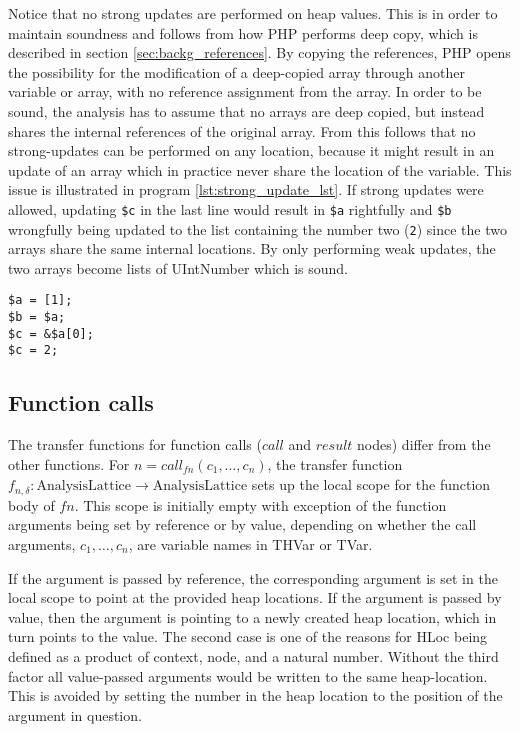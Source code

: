 Notice that no strong updates are performed on heap values. This is in order to maintain soundness and follows from how PHP performs deep copy, which is described in section \ref{sec:backg_references}. By copying the references, PHP opens the possibility for the modification of a deep-copied array through another variable or array, with no reference assignment from the array.  In order to be sound, the analysis has to assume that no arrays are deep copied, but instead shares the internal references of the original array. From this follows that no strong-updates can be performed on any location, because it might result in an update of an array which in practice never share the location of the variable. This issue is illustrated in program \ref{lst:strong_update_lst}. If strong updates were allowed, updating \texttt{\$c} in the last line would result in \texttt{\$a} rightfully and \texttt{\$b} wrongfully being updated to the list containing the number two (\texttt{2}) since the two arrays share the same internal locations. By only performing weak updates, the two arrays become lists of UIntNumber which is sound.
\begin{program}
\centering
\begin{lstlisting}
$a = [1];
$b = $a;
$c = &$a[0];
$c = 2;
\end{lstlisting}
\caption{  }
\label{lst:strong_update_lst}
\end{program}


\subsection{Function calls}
The transfer functions for function calls ($\mathit{call}$ and $\mathit{result}$ nodes) differ from the other functions. For $n = \mathit{call}_{\mathit{fn}}(c_1,\dots,c_n)$, the transfer function $f_{n,\delta} : \text{AnalysisLattice} \rightarrow \text{AnalysisLattice}$ sets up the local scope for the function body of $\mathit{fn}$. This scope is initially empty with exception of the function arguments being set by reference or by value, depending on whether the call arguments, $c_1, \dots, c_n$, are variable names in THVar or TVar. 

If the argument is passed by reference, the corresponding argument is set in the local scope to point at the provided heap locations. If the argument is passed by value, then the argument is pointing to a newly created heap location, which in turn points to the value. The second case is one of the reasons for HLoc being defined as a product of context, node, and a natural number. Without the third factor all value-passed arguments would be written to the same heap-location. This is avoided by setting the number in the heap location to the position of the argument in question. 

